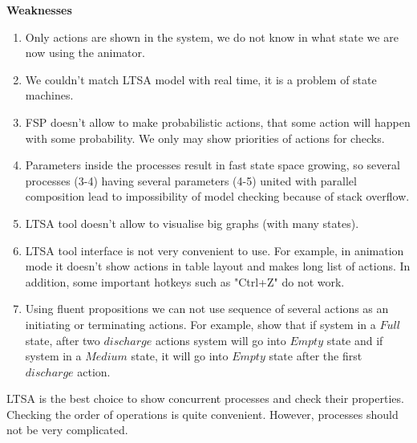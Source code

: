 \documentclass{article}
\begin{document}
\begin{enumerate}
\begin{enumerate}
\end{enumerate}
\textbf{Weaknesses}
\begin{enumerate}
\item Only actions are shown in the system, we do not know in what state we are now using the animator.
\item We couldn't match LTSA model with real time, it is a problem of state machines. 
\item 	FSP doesn't allow to make probabilistic actions, that some action will happen with some probability. We only may show priorities of actions for checks.
\item 	Parameters inside the processes result in fast state space growing, so several processes (3-4) having several parameters (4-5) united with parallel composition lead to impossibility of model checking because of stack overflow.
\item 	LTSA tool doesn't allow to visualise big graphs (with many states).
\item 	LTSA tool interface is not very convenient to use. For example, in animation mode it doesn't show actions in table layout and makes long list of actions. In addition, some important hotkeys such as "Ctrl+Z" do not work.
\item 	Using fluent propositions we can not use sequence of several actions as an initiating or terminating actions. For example, show that if system in a $Full$ state, after two $discharge$ actions system will go into $Empty$ state and if system in a $Medium$ state, it will go into $Empty$ state after the first $discharge$ action.
	
\end{enumerate}

LTSA is the best choice to show concurrent processes and check their properties. Checking the order of operations is quite convenient. However, processes should not be very complicated.

\end{enumerate}
\end{document}
